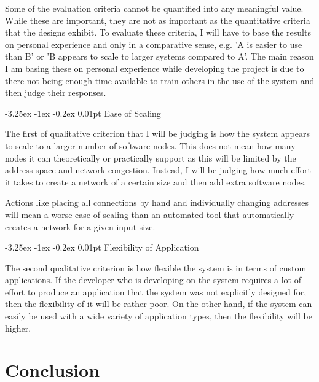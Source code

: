 \documentclass[paper=a4, fontsize=11pt, bibliography=totocnumbered]{scrartcl}
\makeatletter
\renewcommand\paragraph{\@startsection{paragraph}{4}{\z@}%
  {-3.25ex \@plus -1ex \@minus -0.2ex}%
  {0.01pt}%
  {\raggedsection\normalfont\sectfont\nobreak\size@paragraph}%
}
\numberwithin{equation}{section}		%
\numberwithin{figure}{section}			%
\numberwithin{table}{section}				%
\makeatother
\begin{document}
Some of the evaluation criteria cannot be quantified into any meaningful value. While these are important, they are not as important as the quantitative criteria that the designs exhibit. To evaluate these criteria, I will have to base the results on personal experience and only in a comparative sense, e.g. 'A is easier to use than B' or 'B appears to scale to larger systems compared to A'. The main reason I am basing these on personal experience while developing the project is due to there not being enough time available to train others in the use of the system and then judge their responses.

\paragraph{Ease of Scaling}

The first of qualitative criterion that I will be judging is how the system appears to scale to a larger number of \glspl{software node}. This does not mean how many nodes it can theoretically or practically support as this will be limited by the address space and network congestion. Instead, I will be judging how much effort it takes to create a network of a certain size and then add extra \glspl{software node}.

Actions like placing all connections by hand and individually changing addresses will mean a worse ease of scaling than an automated tool that automatically creates a network for a given input size.

\paragraph{Flexibility of Application}

The second qualitative criterion is how flexible the system is in terms of custom applications. If the developer who is developing on the system requires a lot of effort to produce an application that the system was not explicitly designed for, then the flexibility of it will be rather poor. On the other hand, if the system can easily be used with a wide variety of application types, then the flexibility will be higher.

\section{Conclusion}

\printglossaries

\printbibliography

\end{document}

